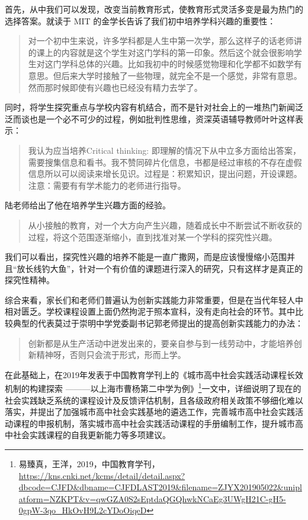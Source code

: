 \documentclass[12pt,UTF8]{ctexart}
\begin{document}
\par {
	首先，从中我们可以发现，改变当前教育形式，使教育形式灵活多变是最为热门的选择答案。就读于 MIT 的金学长告诉了我们初中培养学科兴趣的重要性：
	\begin{quote}
		\kaishu
		对一个初中生来说，许多学科都是人生中第一次学，那么这样子的话老师讲的课上的内容就是这个学生对这门学科的第一印象。然后这个就会很影响学生对这门学科总体的兴趣。比如我初中的时候感觉物理和化学都不如数学有意思。但后来大学时接触了一些物理，就完全不是一个感觉，非常有意思。然而那时候即使有兴趣也已经没有精力去学了。
	\end{quote}
	同时，将学生探究重点与学校内容有机结合，而不是针对社会上的一堆热门新闻泛泛而谈也是一个必不可少的过程，例如批判性思维，资深英语辅导教师叶叶这样表示：
	\begin{quote}
		\kaishu 我认为应当培养Critical thinking:
		即理解的情况下从中立多方面给出答案，需要搜集信息和看书。我不赞同碎片化信息，书都是经过审核的不存在虚假信息所以可以阅读来增长见识。过程是：积累知识，提出问题，开设课题。注意：需要有有学术能力的老师进行指导。
	\end{quote}
	
	陆老师给出了他在培养学生兴趣方面的经验。
	\begin{quote}
		\kaishu 从小接触的教育，对一个大方向产生兴趣，随着成长中不断尝试不断收获的过程，将这个范围逐渐缩小，直到找准对某一个学科的探究性兴趣。
	\end{quote}
	我们可以看出，探究性兴趣的培养不能是一直广撒网，而是应该慢慢缩小范围并且“放长线钓大鱼”，针对一个有价值的课题进行深入的研究，只有这样才是真正的探究性精神。
}
\par {
	
	综合来看，家长们和老师们普遍认为创新实践能力非常重要，但是在当代年轻人中相对匮乏。学校课程设置上面仍然拘泥于照本宣科，没有走向社会的环节。其中比较典型的代表莫过于崇明中学党委副书记郭老师提出的提高创新实践能力的办法：
	\begin{quote}
		\kaishu 创新都是从生产活动中迸发出来的，要亲自参与到一线劳动中，才能培养创新精神呀，否则只会流于形式，形而上学。
	\end{quote}
}
\par {
	在此基础上，在2019年发表于中国教育学刊上的《城市高中社会实践活动课程长效机制的构建探索
	———以上海市曹杨第二中学为例》\footnote{易臻真，王洋，2019，中国教育学刊，\url{https://kns.cnki.net/kcms/detail/detail.aspx?dbcode=CJFD&dbname=CJFDLAST2019&filename=ZJYX201905022&uniplatform=NZKPT&v=qwGZA0S2sEptdaQGQhwkNCaEg3UWgH21C-gH5-0gpW-3qo_HkOvH9L2cYDoOiqeD}}一文中，详细说明了现在的社会实践缺乏系统的课程设计及反馈评估机制，且各级政府相关政策不够细化难以落实，并提出了加强城市高中社会实践基地的遴选工作，完善城市高中社会实践活动课程的申报机制，落实城市高中社会实践活动课程的手册编制工作，提升城市高中社会实践课程的自我更新能力等多项建议。
}
\end{document}
